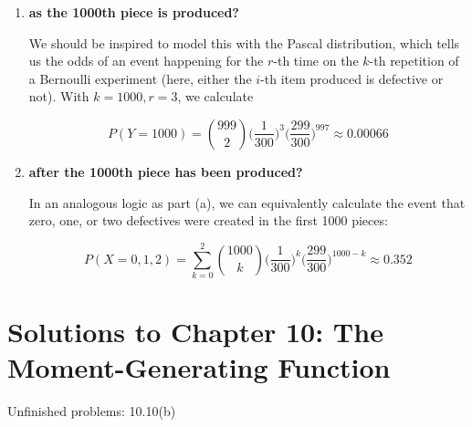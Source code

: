 \documentclass[10pt, oneside]{article}
\begin{document}
\begin{enumerate}[label=9.\arabic*]
\begin{enumerate}
	\item  \begin{tcolorbox}[
	  colback=Cerulean!5!white,
	  colframe=Cerulean!75!black]
	\textbf{as the 1000th piece is produced?}
	\end{tcolorbox}
	
	We should be inspired to model this with the Pascal distribution, which tells us the odds of an event happening for the $r$-th time on the $k$-th repetition of a Bernoulli experiment (here, either the $i$-th item produced is defective or not). With $k = 1000, r = 3$, we calculate
	
	\[ P(Y = 1000) = \binom{999}{2} \bigg( \frac{1}{300} \bigg)^3 \bigg( \frac{299}{300} \bigg)^{997} \approx \boxed{0.00066} \]
	
	\item  \begin{tcolorbox}[
	  colback=Cerulean!5!white,
	  colframe=Cerulean!75!black]
	\textbf{after the 1000th piece has been produced?}
	\end{tcolorbox}
	
	In an analogous logic as part (a), we can equivalently calculate the event that zero, one, or two defectives were created in the first 1000 pieces:
	
	\[ P(X = 0, 1, 2) = \sum^2_{k = 0} \binom{1000}{k} \bigg( \frac{1}{300} \bigg)^k \bigg( \frac{299}{300} \bigg)^{1000-k} \approx \boxed{0.352} \]
	\end{enumerate}

\end{enumerate}

\newpage


\setcounter{cor}{0}
\setcounter{prop}{0}
\setcounter{cor*}{0}

{}
\section*{Solutions to Chapter 10: The Moment-Generating Function}

Unfinished problems: 10.10(b)
\end{document}
